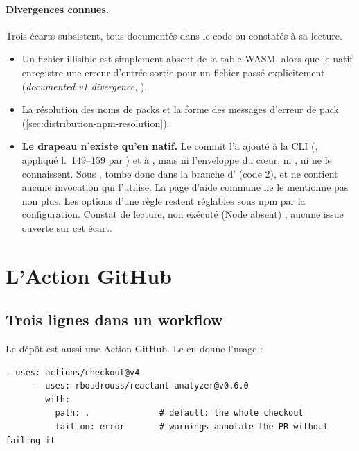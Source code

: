 \paragraph{Divergences connues.} Trois écarts subsistent, tous documentés dans le code ou constatés à sa lecture.
\begin{itemize}
  \item Un fichier illisible est simplement absent de la table WASM, alors que le natif enregistre une erreur d'entrée-sortie pour un fichier passé explicitement (\og \emph{documented v1 divergence}\fg{}, ).
  \item La résolution des noms de packs et la forme des messages d'erreur de pack (\cref{sec:distribution-npm-resolution}).
  \item \textbf{Le drapeau  n'existe qu'en natif.} Le commit  l'a ajouté à la CLI (, appliqué l.~149--159 par ) et à , mais ni l'enveloppe  du cœur, ni , ni  ne le connaissent. Sous ,  tombe donc dans la branche  d' (code 2), et  ne contient aucune invocation qui l'utilise. La page d'aide commune ne le mentionne pas non plus. Les options d'une règle restent réglables sous npm par la configuration. Constat de lecture, non exécuté (Node absent) ; aucune issue ouverte sur cet écart.
\end{itemize}

\section{L'Action GitHub}
\label{sec:distribution-action}

\subsection{Trois lignes dans un workflow}

Le dépôt est aussi une Action GitHub. Le  en donne l'usage :

\begin{lstlisting}[language={},caption={Usage de l'Action (extrait du \file{README.md}, élagué)}]
      - uses: actions/checkout@v4
      - uses: rboudrouss/reactant-analyzer@v0.6.0
        with:
          path: .              # default: the whole checkout
          fail-on: error       # warnings annotate the PR without failing it
\end{lstlisting}

